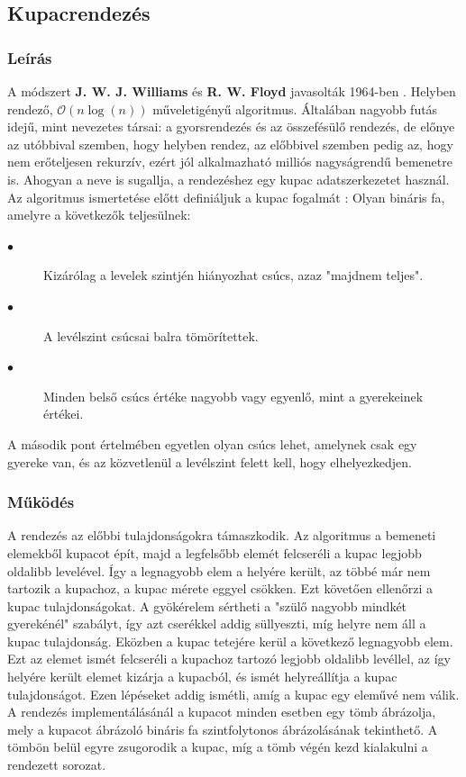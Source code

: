 \documentclass{elteikthesis}
\newcommand{\hiddensubsubsection}[1]{
	\stepcounter{subsubsection}
	\subsubsection*{{#1}}	
}
\begin{document}
\subsection{Kupacrendezés}
\hiddensubsubsection{Leírás}
A módszert \textbf{J. W. J. Williams} és \textbf{R. W. Floyd} javasolták 1964-ben \cite{Ronyai}.
Helyben rendező, $\mathcal{O}(n\log (n))$ műveletigényű algoritmus. Általában nagyobb futás idejű, mint nevezetes társai: a gyorsrendezés és az összefésülő rendezés, de előnye az utóbbival szemben, hogy helyben rendez, az előbbivel szemben pedig az, hogy nem erőteljesen rekurzív, ezért jól alkalmazható milliós nagyságrendű bemenetre is.
Ahogyan a neve is sugallja, a rendezéshez egy kupac adatszerkezetet használ. Az algoritmus ismertetése előtt definiáljuk a kupac fogalmát \cite{Fekete}:
Olyan bináris fa, amelyre a következők teljesülnek:
\begin{description}
	\item[$\bullet$] Kizárólag a levelek szintjén hiányozhat csúcs, azaz "majdnem teljes".
	\item[$\bullet$] A levélszint csúcsai balra tömörítettek.
	\item[$\bullet$] Minden belső csúcs értéke nagyobb vagy egyenlő, mint a gyerekeinek értékei.
\end{description}
A második pont értelmében egyetlen olyan csúcs lehet, amelynek csak egy gyereke van, és az közvetlenül a levélszint felett kell, hogy elhelyezkedjen.\par
\hiddensubsubsection{Működés}
A rendezés az előbbi tulajdonságokra támaszkodik. 
Az algoritmus a bemeneti elemekből kupacot épít, majd a legfelsőbb elemét felcseréli a kupac legjobb oldalibb levelével. Így a legnagyobb elem a helyére került, az többé már nem tartozik a kupachoz, a kupac mérete eggyel csökken. Ezt követően ellenőrzi a kupac tulajdonságokat. A gyökérelem sértheti a "szülő nagyobb mindkét gyerekénél" szabályt, így azt cserékkel addig süllyeszti, míg helyre nem áll a kupac tulajdonság. Eközben a kupac tetejére kerül a következő legnagyobb elem. Ezt az elemet ismét felcseréli a kupachoz tartozó legjobb oldalibb levéllel, az így helyére került elemet kizárja a kupacból, és ismét helyreállítja a kupac tulajdonságot. Ezen lépéseket addig ismétli, amíg a kupac egy eleművé nem válik. A rendezés implementálásánál a kupacot minden esetben egy tömb ábrázolja, mely a kupacot ábrázoló bináris fa szintfolytonos ábrázolásának tekinthető. A tömbön belül egyre zsugorodik a kupac, míg a tömb végén kezd kialakulni a rendezett sorozat.\par
\end{document}

